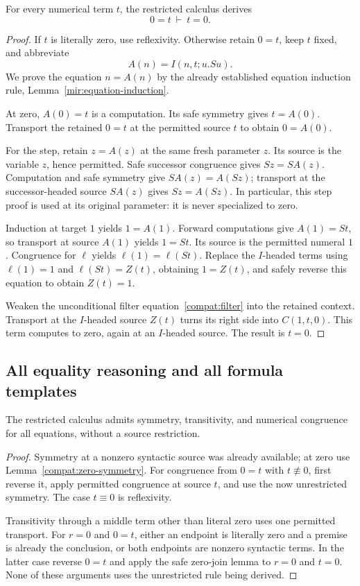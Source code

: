 \begin{lemma}
\label{compat:zero-symmetry}
For every numerical term $t$, the restricted calculus derives
\[
                        0=t\ \vdash\ t=0.
\]
\end{lemma}
\begin{proof}
If $t$ is literally zero, use reflexivity. Otherwise retain $0=t$,
keep $t$ fixed, and abbreviate
\[
                       A(n)=I(n,t;u.Su).
\]
We prove the equation $n=A(n)$ by the already established equation
induction rule, Lemma~\ref{mir:equation-induction}.

At zero, $A(0)=t$ is a computation. Its safe symmetry gives $t=A(0)$.
Transport the retained $0=t$ at the permitted source $t$ to obtain
$0=A(0)$.

For the step, retain $z=A(z)$ at the same fresh parameter $z$.
Its source is the variable $z$, hence permitted. Safe successor
congruence gives $Sz=S A(z)$. Computation and safe symmetry give
$S A(z)=A(Sz)$; transport at the successor-headed source $S A(z)$
gives $Sz=A(Sz)$. In particular, this step proof is used at its
original parameter: it is never specialized to zero.

Induction at target $1$ yields $1=A(1)$. Forward computations give
$A(1)=St$, so transport at source $A(1)$ yields $1=St$.
Its source is the permitted numeral $1$. Congruence for $\ell$ yields
$\ell(1)=\ell(St)$. Replace the $I$-headed terms using
$\ell(1)=1$ and $\ell(St)=Z(t)$, obtaining $1=Z(t)$, and safely reverse
this equation to obtain $Z(t)=1$.

Weaken the unconditional filter equation~\eqref{compat:filter} into the
retained context. Transport at the $I$-headed source $Z(t)$ turns its
right side into $C(1,t,0)$. This term computes to zero, again at an
$I$-headed source. The result is $t=0$.
\end{proof}

\subsection{All equality reasoning and all formula templates}

\begin{lemma}
\label{compat:numerical-equality-restored}
The restricted calculus admits symmetry, transitivity, and numerical
congruence for all equations, without a source restriction.
\end{lemma}
\begin{proof}
Symmetry at a nonzero syntactic source was already available; at zero
use Lemma~\ref{compat:zero-symmetry}. For congruence from $0=t$ with
$t\not\equiv0$, first reverse it, apply permitted congruence at source
$t$, and use the now unrestricted symmetry. The case $t\equiv0$ is
reflexivity.

Transitivity through a middle term other than literal zero uses one
permitted transport. For $r=0$ and $0=t$, either an endpoint is literally
zero and a premise is already the conclusion, or both endpoints are
nonzero syntactic terms. In the latter case reverse $0=t$ and apply
the safe zero-join lemma to $r=0$ and $t=0$. None of these arguments
uses the unrestricted rule being derived.
\end{proof}

